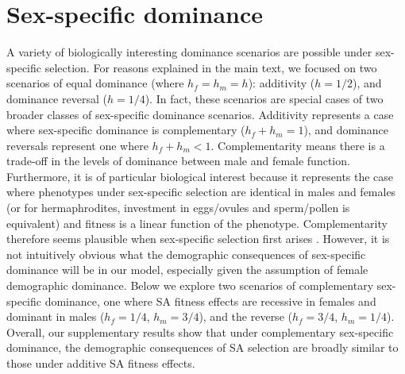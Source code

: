 \documentclass[11pt]{article}
\begin{document}
\newpage{}
\section{Sex-specific dominance}
\renewcommand{\thefigure}{S\arabic{equation}}
\setcounter{figure}{1}  %
\setcounter{equation}{1}  %
\setcounter{table}{1}  %

A variety of biologically interesting dominance scenarios are possible under sex-specific selection. For reasons explained in the main text, we focused on two scenarios of equal dominance (where $h_f = h_m = h$): additivity ($h = 1/2$), and dominance reversal ($h = 1/4$). In fact, these scenarios are special cases of two broader classes of sex-specific dominance scenarios. Additivity represents a case where sex-specific dominance is complementary ($h_f + h_m = 1$), and dominance reversals represent one where $h_f + h_m < 1$. Complementarity means there is a trade-off in the levels of dominance between male and female function. Furthermore, it is of particular biological interest because it represents the case where phenotypes under sex-specific selection are identical in males and females (or for hermaphrodites, investment in eggs/ovules and sperm/pollen is equivalent) and fitness is a linear function of the phenotype. Complementarity therefore seems plausible when sex-specific selection first arises \citep{SpencerPriest2016}. However, it is not intuitively obvious what the demographic consequences of sex-specific dominance will be in our model, especially given the assumption of female demographic dominance. Below we explore two scenarios of complementary sex-specific dominance, one where SA fitness effects are recessive in females and dominant in males ($h_f = 1/4$, $h_m = 3/4$), and the reverse ($h_f = 3/4$, $h_m = 1/4$). Overall, our supplementary results show that under complementary sex-specific dominance, the demographic consequences of SA selection are broadly similar to those under additive SA fitness effects.
\end{document}
